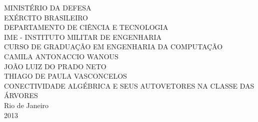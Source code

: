 \begin{titlepage}

\begin{center}
\large{MINISTÉRIO DA DEFESA} \\
\large{EXÉRCITO BRASILEIRO} \\
\large{DEPARTAMENTO DE CIÊNCIA E TECNOLOGIA}\\
\large{IME - INSTITUTO MILITAR DE ENGENHARIA} \\
\large{CURSO DE GRADUAÇÃO EM ENGENHARIA DA COMPUTAÇÃO} \\
\vspace{5 cm}
\large{CAMILA ANTONACCIO WANOUS} \\
\large{JOÃO LUIZ DO PRADO NETO} \\
\large{THIAGO DE PAULA VASCONCELOS} \\
\vspace{5 cm}
\large{CONECTIVIDADE ALGÉBRICA E SEUS AUTOVETORES NA CLASSE DAS ÁRVORES}\\
\vspace{5 cm}
Rio de Janeiro\\
2013
\end{center}

\end{titlepage}

%
%
%
%
%
%
%
%
%
%
%
%
%
